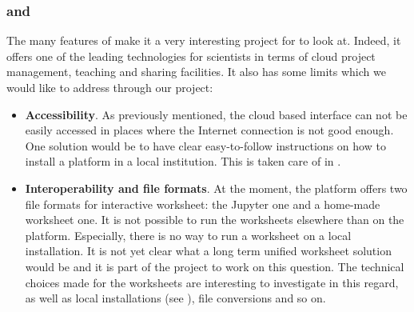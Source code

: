 \documentclass{deliverablereport}
\begin{document}
\subsubsection{\SMC and \ODK}

The many features of \SMC make it a very interesting project for \ODK
to look at. Indeed, it offers one of the leading technologies for
scientists in terms of cloud project management, teaching and sharing
facilities. It also has some limits which we would like to address
through our project:

\begin{itemize}
\item \textbf{Accessibility}. As previously mentioned, the cloud based
  interface can not be easily accessed in places where the Internet
  connection is not good enough. One solution would be to have clear
  easy-to-follow instructions on how to install a \SMC platform in a
  local institution. This is taken care of in
  .

\item \textbf{Interoperability and file formats}. At the moment, the
  \SMC platform offers two file formats for interactive worksheet: the
  Jupyter one and a home-made \Sage worksheet one. It is not possible
  to run the \Sage worksheets elsewhere than on the
  platform. Especially, there is no way to run a \Sage worksheet on a
  local \Sage installation. It is not yet clear what a long term
  unified worksheet solution would be and it is part of the \ODK
  project to work on this question. The technical choices made for the
  \Sage worksheets are interesting to investigate in this regard, as
  well as local \SMC installations (see
  ), file conversions
  and so on.
\end{itemize}
\end{document}
